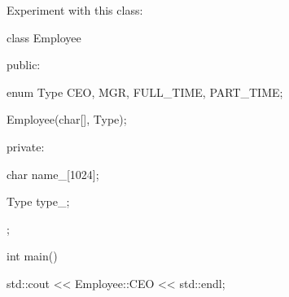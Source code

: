 Experiment with this class:



\begin{consolethree}[escapeinside=||]

class Employee {

public:

    enum Type {CEO, MGR, FULL_TIME, PART_TIME};

    Employee(char[], Type);

private:

    char name_[1024];

    Type type_;

};



int main()

{

    std::cout << Employee::CEO << std::endl;

}

\end{consolethree}

